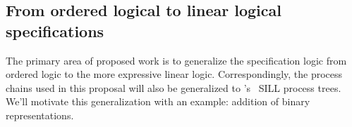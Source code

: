 

\subsection{From ordered logical to linear logical specifications}\label{sec:from-ordered-logical}

The primary area of proposed work is to generalize the specification logic from ordered logic to the more expressive linear logic.
Correspondingly, the process chains used in this proposal will also be generalized to \citeauthor{Caires+:MSCS13}'s~\autocite*{Caires+:MSCS13} \ac{SILL} process trees.
We'll motivate this generalization with an example: addition of binary representations.


